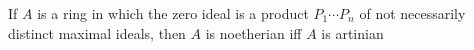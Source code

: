 If $A$ is a ring in which the zero ideal is a product $P_1\cdots P_n$ of not necessarily
distinct maximal ideals, then $A$ is noetherian iff $A$ is artinian
